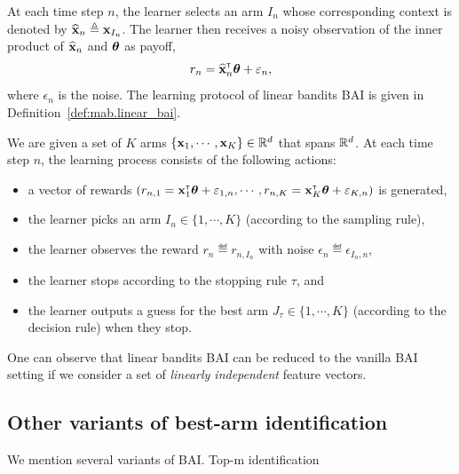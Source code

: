 At each time step $n$, the learner selects an arm $I_n$ whose corresponding context is denoted by $\widehat{{\bf x}}_n\triangleq {\bf x}_{I_n}$. The learner then receives a noisy observation of the inner product of $\widehat{{\bf x}}_n$ and ${\boldsymbol \theta}$ as payoff,
\[
    r_n = \widehat{{\bf x}}_n^\mathsf{\scriptscriptstyle T}{\boldsymbol \theta} + \varepsilon_n,
\]
where $\epsilon_n$ is the noise. The learning protocol of linear bandits BAI is given in Definition~\ref{def:mab.linear_bai}.

\begin{definition}\label{def:mab.linear_bai}
\begin{leftbar}[defnbar]
	We are given a set of $K$ arms $\{{\bf x}_1,\cdots,{\bf x}_K\}\in\mathbb{R}^d$ that spans $\mathbb{R}^d$. At each time step $n$, the learning process consists of the following actions:
\begin{itemize}
	\item a vector of rewards $(r_{n,1} = {\bf x}_1^\mathsf{\scriptscriptstyle T}{\boldsymbol \theta}+\varepsilon_{1,n}, \cdots, r_{n,K} = {\bf x}_K^\mathsf{\scriptscriptstyle T}{\boldsymbol \theta}+\varepsilon_{K,n})$ is generated,
	\item the learner picks an arm $I_n \in \{1,\cdots,K\}$ (according to the sampling rule),
	\item the learner observes the reward $r_n \eqdef r_{n,I_n}$ with noise $\epsilon_n \eqdef \epsilon_{I_n,n}$,
	\item the learner stops according to the stopping rule $\tau$, and
	\item the learner outputs a guess for the best arm $J_\tau \in \{1,\cdots,K\}$ (according to the decision rule) when they stop.
\end{itemize}
\end{leftbar}
\end{definition}

\begin{remark}\label{remark:mab.reduction}
\begin{leftbar}[remarkbar]
    One can observe that linear bandits BAI can be reduced to the vanilla BAI setting if we consider a set of \emph{linearly independent} feature vectors.
\end{leftbar}
\end{remark}

\subsection{Other variants of best-arm identification}\label{sec:mab.extensions.other}

We mention several variants of BAI. Top-m identification~\citep{kalyanakrishnan2010}

